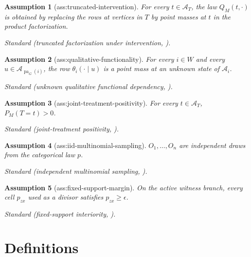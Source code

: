 \documentclass{article}
\newtheorem{assumption}{Assumption}
\begin{document}
\begin{assumption}[ass:truncated-intervention]\label{ass:truncated-intervention}
For every \(t\in\mathcal A_T\), the law \(Q_M(t,\cdot)\) is obtained by replacing the rows at vertices in \(T\) by point masses at \(t\) in the product factorization.
\par\smallskip\noindent\emph{Standard} (truncated factorization under intervention, \cite{Pearl2009}).
\end{assumption}

\begin{assumption}[ass:qualitative-functionality]\label{ass:qualitative-functionality}
For every \(i\in W\) and every \(u\in\mathcal A_{\operatorname{pa}_G(i)}\), the row \(\theta_i(\cdot\mid u)\) is a point mass at an unknown state of \(\mathcal A_i\).
\par\smallskip\noindent\emph{Standard} (unknown qualitative functional dependency, \cite{ChenDarwiche2024}).
\end{assumption}

\begin{assumption}[ass:joint-treatment-positivity]\label{ass:joint-treatment-positivity}
For every \(t\in\mathcal A_T\), \(P_M(T=t)>0\).
\par\smallskip\noindent\emph{Standard} (joint-treatment positivity, \cite{HwangEtAl2024}).
\end{assumption}

\begin{assumption}[ass:iid-multinomial-sampling]\label{ass:iid-multinomial-sampling}
\(O_1,\ldots,O_n\) are independent draws from the categorical law \(p\).
\par\smallskip\noindent\emph{Standard} (independent multinomial sampling, \cite{vanDerVaart1998}).
\end{assumption}

\begin{assumption}[ass:fixed-support-margin]\label{ass:fixed-support-margin}
On the active witness branch, every cell \(p_{zx}\) used as a divisor satisfies \(p_{zx}\ge\epsilon\).
\par\smallskip\noindent\emph{Standard} (fixed-support interiority, \cite{vanDerVaart1998}).
\end{assumption}

\section{Definitions}
\end{document}
